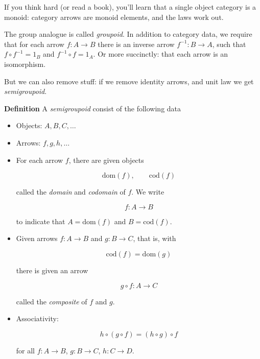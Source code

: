 \documentclass{article}
\begin{document}
If you think hard (or read a book), you'll learn that a single object
category is a monoid: category arrows are monoid elements, and the
laws work out.

The group analogue is called \emph{groupoid}. In addition to
category data, we require that for each arrow $f : A \to B$ there is an inverse arrow $f^{-1} : B \to A$,
such that $f \circ f^{-1} = 1_B$ and $f^{-1} \circ f = 1_A$.
Or more succinctly: that each arrow is an isomorphism.

But we can also remove stuff: if we remove identity arrows,
and unit law we get \emph{semigroupoid}.

\textbf{Definition}
A \emph{semigroupoid} consist of the following data
\begin{itemize}
\item Objects: $A, B, C, \ldots$
\item Arrows: $f, g, h, \ldots$

\item For each arrow $f$, there are given objects

\begin{equation*}
\mathrm{dom}(f), \qquad \mathrm{cod}(f)
\end{equation*}

called the \emph{domain} and \emph{codomain} of $f$. We write

\begin{equation*}
f : A \to B
\end{equation*}

to indicate that $A = \mathrm{dom}(f)$ and $B = \mathrm{cod}(f)$.

\item Given arrows $f : A \to B$ and $g : B \to C$, that is, with

\begin{equation*}
\mathrm{cod}(f) = \mathrm{dom}(g)
\end{equation*}

there is given an arrow

\begin{equation*}
g \circ f : A \to C
\end{equation*}

called the \emph{composite} of $f$ and $g$.

\item Associativity:

\begin{equation*}
h \circ (g \circ f) = (h \circ g) \circ f
\end{equation*}

for all $f : A \to B$, $g : B \to C$, $h : C \to D$.

\end{itemize}
\end{document}
